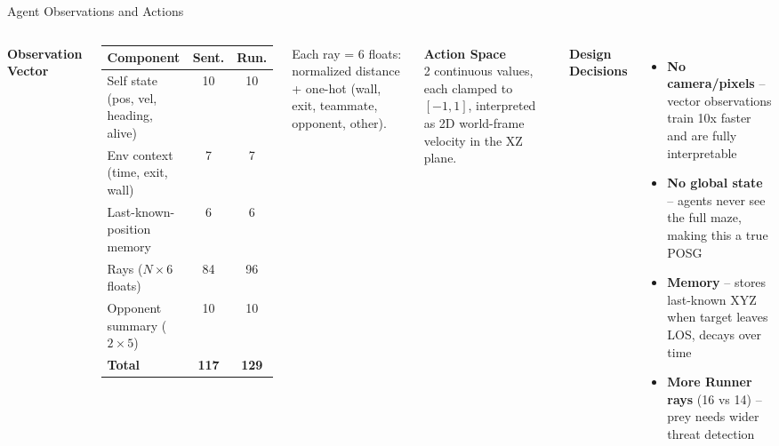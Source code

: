 \documentclass[aspectratio=169,11pt]{beamer}
\begin{document}
\begin{frame}{Agent Observations and Actions}
\begin{columns}[T]
\textbf{Observation Vector}
\begin{tabular}{@{}lcc@{}}
\toprule
\textbf{Component} & \textbf{Sent.} & \textbf{Run.} \\
\midrule
Self state (pos, vel, heading, alive) & 10 & 10 \\
Env context (time, exit, wall) & 7 & 7 \\
Last-known-position memory & 6 & 6 \\
Rays ($N \times 6$ floats) & 84 & 96 \\
Opponent summary ($2 \times 5$) & 10 & 10 \\
\midrule
\textbf{Total} & \textbf{117} & \textbf{129} \\
\bottomrule
\end{tabular}

\vspace{6pt}
Each ray = 6 floats: normalized distance + one-hot (wall, exit, teammate, opponent, other).

\textbf{Action Space}\\
2 continuous values, each clamped to $[-1, 1]$, interpreted as 2D world-frame velocity in the XZ plane.

\vspace{6pt}
\textbf{Design Decisions}
\begin{itemize}
\item \textbf{No camera/pixels} -- vector observations train 10x faster and are fully interpretable
\item \textbf{No global state} -- agents never see the full maze, making this a true POSG
\item \textbf{Memory} -- stores last-known XYZ when target leaves LOS, decays over time
\item \textbf{More Runner rays} (16 vs 14) -- prey needs wider threat detection
\end{itemize}
\end{columns}
\end{frame}
\end{document}
